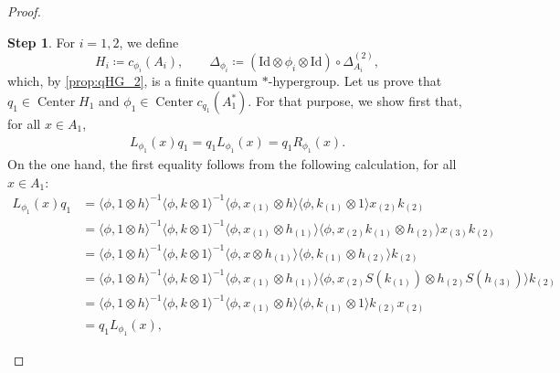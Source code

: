 \documentclass[a4paper,10pt]{amsart}
\newcommand{\eval}[2]{\langle #1 , #2\rangle}
\theoremstyle{definition}
\newtheorem{step-goursat}{Step}
\begin{document}
\begin{proof}
    \begin{step-goursat}
    For $i=1,2$, we define 
    \[
        H_i
            \coloneqq
            c_{\phi_i}(A_i),
        \qquad
        \Delta_{\phi_i}
            \coloneqq
            (\mathrm{Id} \otimes \phi_i \otimes \mathrm{Id}) \circ \Delta_{A_i}^{(2)},
    \]
    which, by \cref{prop:qHG_2}, is a finite quantum $*$-hypergroup.
    \smallbreak\noindent%
    Let us prove that $q_1\in \operatorname{Center}H_1$ and $\phi_1 \in \operatorname{Center}c_{q_1}(A_1^*)$. 
    \smallbreak\noindent%
    For that purpose, we show first that, for all $x\in A_1$,
    \begin{align} \label{eq:q_commute_H}
        L_{\phi_1}(x) q_1
        =
        q_1 L_{\phi_1}(x)
        =
        q_1 R_{\phi_1}(x).
    \end{align}
    On the one hand, the first equality follows from the following calculation, for all $x\in A_1$:
    \begin{align*}
        L_{\phi_1}(x) q_1
        &=
            \eval{\phi}{1\otimes h}^{-1}
                \eval{\phi}{k\otimes 1}^{-1}
                    \eval{\phi}{x_{(1)}\otimes h}
                        \eval{\phi}{k_{(1)}\otimes 1}
                            x_{(2)} k_{(2)}
        \\
        &=
            \eval{\phi}{1\otimes h}^{-1}
                \eval{\phi}{k\otimes 1}^{-1}
                    \eval{\phi}{x_{(1)}\otimes h_{(1)}}
                        \eval{\phi}{x_{(2)}
                            k_{(1)} \otimes h_{(2)}} x_{(3)}k_{(2)}
        \\
        &=
            \eval{\phi}{1 \otimes h}^{-1}
                \eval{\phi}{k \otimes 1}^{-1}
                    \eval{\phi}{x \otimes h_{(1)}}
                        \eval{\phi}{k_{(1)} \otimes h_{(2)}}
                            k_{(2)}
        \\
        &= 
            \eval{\phi}{1\otimes h}^{-1}
                \eval{\phi}{k \otimes 1}^{-1}
                    \eval{\phi}{x_{(1)} \otimes h_{(1)}}
                        \eval{\phi}{x_{(2)}S(k_{(1)}) \otimes h_{(2)}S(h_{(3)})}
                            k_{(2)}
        \\
        &= 
            \eval{\phi}{1\otimes h}^{-1}
                \eval{\phi}{k \otimes 1}^{-1}
                    \eval{\phi}{x_{(1)} \otimes h}
                        \eval{\phi}{k_{(1)} \otimes 1}
                            k_{(2)}x_{(2)}
        \\
        &= 
            q_1 L_{\phi_1}(x),

\end{align*}
\end{step-goursat}
\end{proof}
\end{document}
